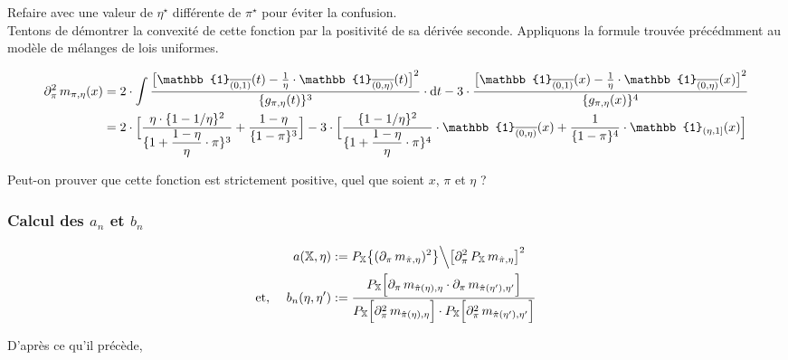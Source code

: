 \documentclass{article}
\begin{document}
    {\color{red} Refaire avec une valeur de $\eta^\star$ différente de $\pi^\star$ pour éviter la confusion.} \\

    Tentons de démontrer la convexité de cette fonction par la positivité de sa dérivée seconde. Appliquons la formule trouvée précédmment au modèle de mélanges de lois uniformes. 

    \begin{align*}
        \partial^2_\pi\,m_{\pi,\eta}(x)   & = 2\cdot\mathop{\mathlarger{\int}}\dfrac{\big[\mathbb{1}_{\overline{(0,1)}}(t)-\frac{1}{\eta}\cdot\mathbb{1}_{\overline{(0,\eta)}}(t)\big]^2}{\{g_{\pi,\eta}(t)\}^3}\cdot\mathrm{d}t - 3\cdot\dfrac{\big[\mathbb{1}_{\overline{(0,1)}}(x)-\frac{1}{\eta}\cdot\mathbb{1}_{\overline{(0,\eta)}}(x)\big]^2}{\{g_{\pi,\eta}(x)\}^4} \\
                                            & = 2\cdot\Big[ \dfrac{\eta\cdot\{1-1/\eta\}^2}{\{1+\dfrac{1-\eta}{\eta}\cdot\pi\}^3} + \dfrac{1-\eta}{\{1-\pi\}^3}\Big] - 3\cdot\Big[ \dfrac{\{1-1/\eta\}^2}{\{1+\dfrac{1-\eta}{\eta}\cdot\pi\}^4}\cdot\mathbb{1}_{\overline{(0,\eta)}}(x) + \dfrac{1}{\{1-\pi\}^4}\cdot\mathbb{1}_{(\eta,1]}(x) \Big]
    \end{align*}

    {\color{red} Peut-on prouver que cette fonction est strictement positive, quel que soient $x$, $\pi$ et $\eta$ ?}

    \subsubsection{Calcul des $a_n$ et $b_n$}

    \begin{align*}
        a(\mathbb{X,\eta})          %
                                    & := P_\mathbb{X}\big\{ (\partial_\pi\,m_{\hat\pi,\eta})^2 \big\} \Big\backslash \big[ \partial^2_\pi\,P_\mathbb{X}\,m_{\hat\pi,\eta} \big]^2 \\
        \mbox{et, }\quad b_n(\eta,\eta') & := \dfrac{ P_\mathbb{X}\Big[ \partial_\pi\,m_{\hat\pi(\eta),\eta} \cdot \partial_\pi\,m_{\hat\pi(\eta'),\eta'}\Big]}{P_\mathbb{X}\Big[ \partial^2_{\pi}\,m_{\hat\pi(\eta),\eta}\Big] \cdot P_\mathbb{X}\Big[ \partial^2_{\pi}\,m_{\hat\pi(\eta'),\eta'}\Big]}
    \end{align*}

    D'après ce qu'il précède,
\end{document}
